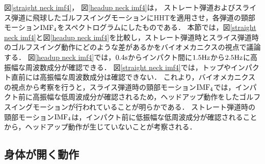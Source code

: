 図\ref{straight neck imf4}，
図\ref{headup neck imf4}は，
ストレート弾道およびスライス弾道に飛球したゴルフスイングモーションにHHTを適用させ，各弾道の頸部モーション${\rm{IMF}}_{4}$をスペクトログラムにしたものである．
本節では，図\ref{straight neck imf4}と図\ref{headup neck imf4}を比較し，ストレート弾道時とスライス弾道時のゴルフスイング動作にどのような差があるかをバイオメカニクスの視点で議論する．
図\ref{headup neck imf4}では，$0.4\rm{s}$からインパクト間に$1.5\rm{Hz}$から$2.5\rm{Hz}$に高振幅な周波数成分が確認できる．
図\ref{straight neck imf4}では，トップやインパクト直前には高振幅な周波数成分は確認できない．
これより，バイオメカニクスの視点から考察を行うと，スライス弾道時の頸部モーション${\rm{IMF}}_{4}$では，インパクト前に高振幅な低周波成分が確認されるため，ヘッドアップ動作をしたゴルフスイングモーションが行われていることが明らかである．
ストレート弾道時の頸部モーション${\rm{IMF}}_{4}$は，インパクト前に低振幅な低周波成分が確認されることから，ヘッドアップ動作が生じていないことが考察される．

\subsection{身体が開く動作}


